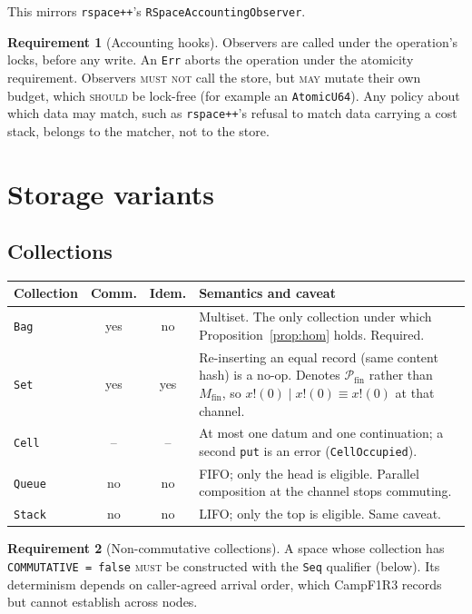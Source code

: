 \documentclass[11pt]{article}
\theoremstyle{plain}
\theoremstyle{definition}
\newtheorem{requirement}{Requirement}
\newcommand{\Camp}{CampF1R3}
\newcommand{\Mfin}{M_{\mathrm{fin}}}
\newcommand{\MUST}{\textsc{must}}
\newcommand{\MUSTNOT}{\textsc{must not}}
\newcommand{\SHOULD}{\textsc{should}}
\newcommand{\MAY}{\textsc{may}}
\newcommand{\code}[1]{\texttt{#1}}
\begin{document}
This mirrors \code{rspace++}'s \code{RSpaceAccountingObserver}.

\begin{requirement}[Accounting hooks]
Observers are called under the operation's locks, before any write. An \code{Err}
aborts the operation under the atomicity requirement. Observers \MUSTNOT{} call the
store, but \MAY{} mutate their own budget, which \SHOULD{} be lock-free (for example
an \code{AtomicU64}). Any policy about which data may match, such as
\code{rspace++}'s refusal to match data carrying a cost stack, belongs to the
matcher, not to the store.
\end{requirement}
\section{Storage variants}\label{sec:variants}

\subsection{Collections}

\begin{center}
\begin{tabularx}{\linewidth}{@{}lccX@{}}
\toprule
Collection & Comm. & Idem. & Semantics and caveat\\
\midrule
\code{Bag} & yes & no & Multiset. The only collection under which Proposition~\ref{prop:hom} holds. Required.\\
\code{Set} & yes & yes & Re-inserting an equal record (same content hash) is a no-op. Denotes $\mathcal P_{\mathrm{fin}}$ rather than $\Mfin$, so $x!(0)\mid x!(0)\equiv x!(0)$ at that channel.\\
\code{Cell} & -- & -- & At most one datum and one continuation; a second \code{put} is an error (\code{CellOccupied}).\\
\code{Queue} & no & no & FIFO; only the head is eligible. Parallel composition at the channel stops commuting.\\
\code{Stack} & no & no & LIFO; only the top is eligible. Same caveat.\\
\bottomrule
\end{tabularx}
\end{center}

\begin{requirement}[Non-commutative collections]
A space whose collection has \code{COMMUTATIVE = false} \MUST{} be constructed with
the \code{Seq} qualifier (below). Its determinism depends on caller-agreed arrival
order, which \Camp{} records but cannot establish across nodes.
\end{requirement}
\end{document}
